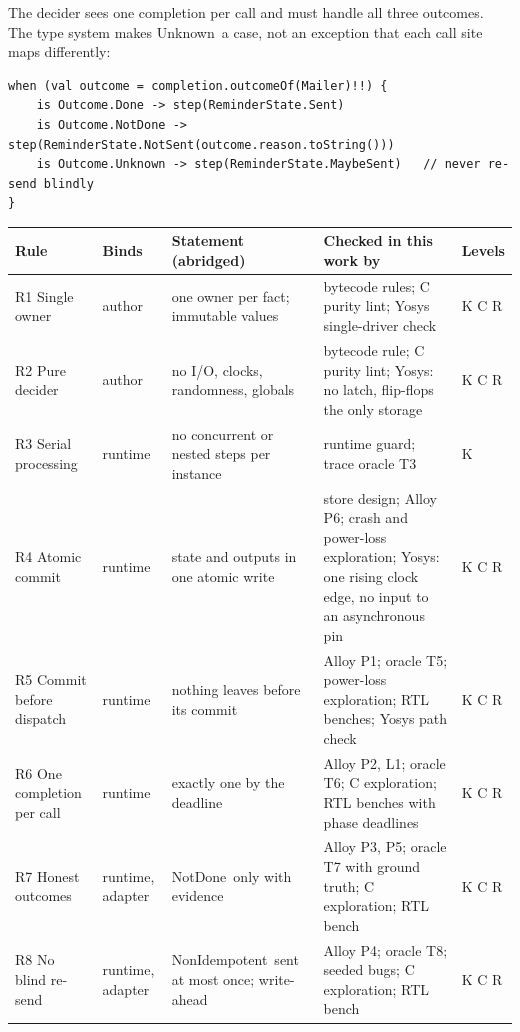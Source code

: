 \documentclass[11pt]{article}
\theoremstyle{definition}
\theoremstyle{plain}
\newcommand{\NotDone}{\textsf{NotDone}}
\newcommand{\Unknown}{\textsf{Unknown}}
\newcommand{\NonIdem}{\textsf{NonIdempotent}}
\begin{document}
The decider sees one completion per call and must handle all three outcomes. The type system makes \Unknown\ a case, not an exception that each call site maps differently:
\begin{lstlisting}
when (val outcome = completion.outcomeOf(Mailer)!!) {
    is Outcome.Done -> step(ReminderState.Sent)
    is Outcome.NotDone -> step(ReminderState.NotSent(outcome.reason.toString()))
    is Outcome.Unknown -> step(ReminderState.MaybeSent)   // never re-send blindly
}
\end{lstlisting}

\begin{table}[tp]
\centering\footnotesize
\renewcommand{\arraystretch}{1.15}
\begin{tabularx}{\textwidth}{@{}>{\raggedright\arraybackslash}p{2.6cm}>{\raggedright\arraybackslash}p{1.4cm}>{\raggedright\arraybackslash}X>{\raggedright\arraybackslash}X>{\raggedright\arraybackslash}p{1.1cm}@{}}
\toprule
Rule & Binds & Statement (abridged) & Checked in this work by & Levels \\
\midrule
R1 Single owner & author & one owner per fact; immutable values & bytecode rules; C purity lint; Yosys single-driver check & K C R \\
R2 Pure decider & author & no I/O, clocks, randomness, globals & bytecode rule; C purity lint; Yosys: no latch, flip-flops the only storage & K C R \\
R3 Serial processing & runtime & no concurrent or nested steps per instance & runtime guard; trace oracle T3 & K \\
R4 Atomic commit & runtime & state and outputs in one atomic write & store design; Alloy P6; crash and power-loss exploration; Yosys: one rising clock edge, no input to an asynchronous pin & K C R \\
R5 Commit before dispatch & runtime & nothing leaves before its commit & Alloy P1; oracle T5; power-loss exploration; RTL benches; Yosys path check & K C R \\
R6 One completion per call & runtime & exactly one by the deadline & Alloy P2, L1; oracle T6; C exploration; RTL benches with phase deadlines & K C R \\
R7 Honest outcomes & runtime, adapter & \NotDone\ only with evidence & Alloy P3, P5; oracle T7 with ground truth; C exploration; RTL bench & K C R \\
R8 No blind re-send & runtime, adapter & \NonIdem\ sent at most once; write-ahead & Alloy P4; oracle T8; seeded bugs; C exploration; RTL bench & K C R \\

\end{tabularx}
\end{table}
\end{document}
